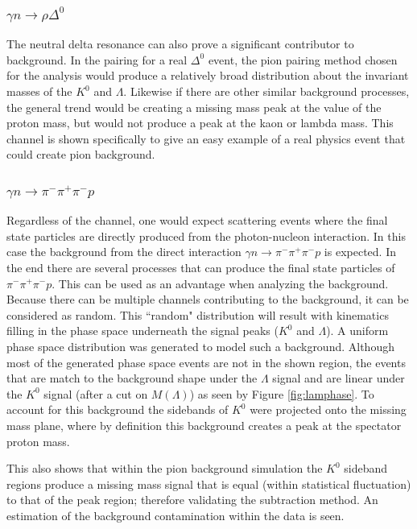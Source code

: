 \documentclass[prb,10pt,twocolumn,tightenlines,superscriptaddress]{revtex4-1}
\begin{document}
\subsubsection{$\gamma n \rightarrow \rho\Delta^{0}$}
The neutral delta resonance can also prove a significant contributor to background. In the pairing for a real $\Delta^{0}$ event, the pion pairing method chosen for the analysis would produce a relatively broad distribution about the invariant masses of the $K^{0}$ and $\Lambda$. Likewise if there are other similar background processes, the general trend would be creating a missing mass peak at the value of the proton mass, but would not produce a peak at the kaon or lambda mass. This channel is shown specifically to give an easy example of a real physics event that could create pion background.

\subsubsection{$\gamma n \rightarrow \pi^{-}\pi^{+}\pi^{-}p$}
Regardless of the channel, one would expect scattering events where the final state particles are directly produced from the photon-nucleon interaction. In this case the background from the direct interaction $\gamma n \rightarrow \pi^{-}\pi^{+}\pi^{-}p$ is expected. In the end there are several processes that can produce the final state particles of $\pi^{-}\pi^{+}\pi^{-}p$. This can be used as an advantage when analyzing the background. Because there can be multiple channels contributing to the background, it can be considered as random. This ``random" distribution will result with kinematics filling in the phase space underneath the signal peaks ($K^{0}$ and $\Lambda$). A uniform phase space distribution was generated to model such a background. Although most of the generated phase space events are not in the shown region, the events that are match to the background shape under the $\Lambda$ signal and are linear under the $K^{0}$ signal (after a cut on $M(\Lambda)$) as seen by Figure \ref{fig:lamphase}. To account for this background the sidebands of $K^{0}$ were projected onto the missing mass plane, where by definition this background creates a peak at the spectator proton mass.

This also shows that within the pion background simulation the $K^{0}$ sideband regions produce a missing mass signal that is equal (within statistical fluctuation) to that of the peak region; therefore validating the subtraction method. An estimation of the background contamination within the data is seen. 
\end{document}
